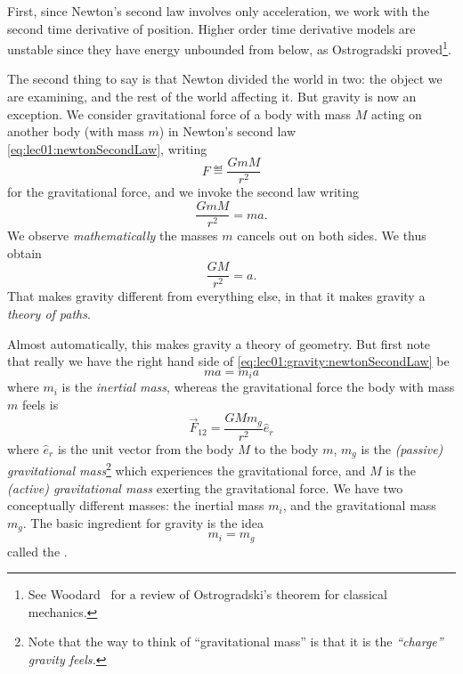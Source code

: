First, since Newton's second law involves only acceleration, we
work with the second time derivative of position. Higher order time
derivative models are unstable since they have energy unbounded
from below, as Ostrogradski proved\footnote{See
  Woodard~\cite[\normalfont\S2]{Woodard:2006nt} for a review of
  Ostrogradski's theorem for classical mechanics.}. 

The second thing to say is that Newton divided the world in two:
the object we are examining, and the rest of the world affecting
it. But gravity is now an exception. We consider gravitational
force of a body with mass $M$ acting on another body (with mass
$m$) in Newton's second law \eqref{eq:lec01:newtonSecondLaw},
writing
\begin{equation}
F\eqdef\frac{GmM}{r^{2}}
\end{equation}
for the gravitational force, and we invoke the second law writing
\begin{equation}\label{eq:lec01:gravity:newtonSecondLaw}
\frac{GmM}{r^{2}}=ma.
\end{equation}
We observe \emph{mathematically} the masses $m$ cancels out on
both sides. We thus obtain
\begin{equation}
\frac{GM}{r^{2}}=a.
\end{equation}
That makes gravity different from everything else, in that it
makes gravity a \emph{theory of paths}.

Almost automatically, this makes gravity a theory of
geometry. But first note that really we have the right hand side
of \eqref{eq:lec01:gravity:newtonSecondLaw} be
\begin{equation}
ma=m_{i}a
\end{equation}
where $m_{i}$ is the \emph{inertial mass}, whereas the
gravitational force the body with mass $m$ feels is
\begin{equation}
\vec{F}_{12}=\frac{GMm_{g}}{r^{2}}\widehat{e}_{r}
\end{equation}
where $\widehat{e}_{r}$ is the unit vector from the body $M$ to
the body $m$, $m_{g}$ is the \emph{(passive) gravitational
  mass}\footnote{Note that the way to think of ``gravitational
  mass'' is that it is the \emph{``charge'' gravity feels.}}
which experiences the gravitational force, and $M$
is the \emph{(active) gravitational mass} exerting the
gravitational force. We have two conceptually different masses:
the inertial mass $m_{i}$, and the gravitational mass
$m_{g}$. The basic ingredient for gravity is the idea 
\begin{equation}\label{eq:lec01:weakEquiv}
m_{i}=m_{g}
\end{equation}
called the . 

